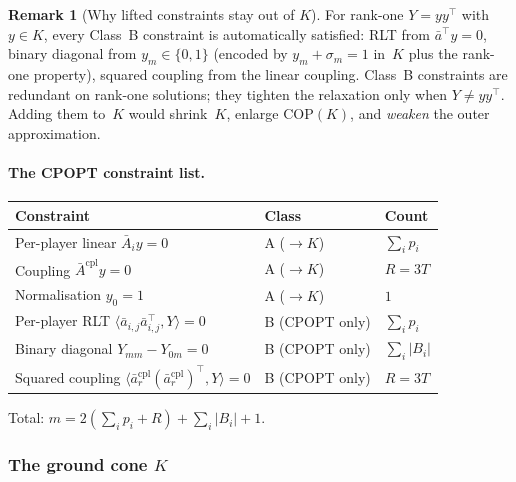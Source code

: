 \documentclass[11pt]{article}
\theoremstyle{definition}
\newtheorem{remark}{Remark}
\newcommand{\inner}[2]{\langle #1, #2 \rangle}
\begin{document}
\begin{remark}[Why lifted constraints stay out of $K$]
\label{rem:lifted-not-K}
For rank-one $Y=yy^{\top}$ with $y\in K$, every Class~B constraint
is automatically satisfied: RLT from $\bar a^{\top}y=0$, binary
diagonal from $y_m\in\{0,1\}$ (encoded by $y_m+\sigma_m=1$ in~$K$
plus the rank-one property), squared coupling from the linear coupling.
Class~B constraints are redundant on rank-one solutions; they tighten
the relaxation only when $Y\neq yy^{\top}$.  Adding them to~$K$ would
shrink~$K$, enlarge $\mathrm{COP}(K)$, and \emph{weaken} the outer
approximation.
\end{remark}

\paragraph{The CPOPT constraint list.}
\begin{center}\small
\begin{tabular}{@{}l l l@{}}
\toprule
Constraint & Class & Count\\
\midrule
Per-player linear $\bar A_iy=0$ & A ($\to K$) & $\sum_i p_i$\\
Coupling $\bar A^{\mathrm{cpl}}y=0$ & A ($\to K$) & $R=3T$\\
Normalisation $y_0=1$ & A ($\to K$) & $1$\\[2pt]
Per-player RLT $\inner{\bar a_{i,j}\bar a_{i,j}^{\top}}{Y}=0$
  & B (CPOPT only) & $\sum_i p_i$\\
Binary diagonal $Y_{mm}-Y_{0m}=0$ & B (CPOPT only) & $\sum_i|B_i|$\\
Squared coupling
  $\inner{\bar a^{\mathrm{cpl}}_r(\bar a^{\mathrm{cpl}}_r)^{\top}}{Y}=0$
  & B (CPOPT only) & $R=3T$\\
\bottomrule
\end{tabular}
\end{center}
Total: $m=2(\sum_ip_i+R)+\sum_i|B_i|+1$.

\subsubsection{The ground cone $K$}
\label{sec:ground-cone}
\end{document}
